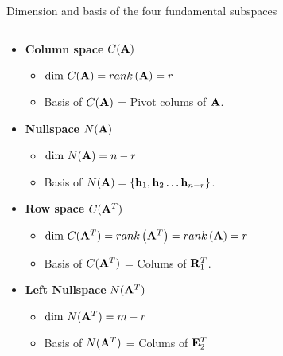 \documentclass[aspectratio=169]{beamer}
\def\mf{\ensuremath\mathbf}
\begin{document}
\begin{frame}[t]{Dimension and basis of the four fundamental subspaces}
\begin{columns}[T]
\begin{column}{0.5\textwidth}
\begin{small}
\begin{itemize}
    \item \textbf{Column space} $C(\mf{A})$
    \begin{itemize}
        \item $\dim \,C(\mf{A}) = rank\left(\mf{A}\right) = r$
        \item Basis of $C(\mf{A})$ = Pivot colums of $\mf{A}$.
    \end{itemize}
    \item \textbf{Nullspace} $N(\mf{A})$
    \begin{itemize}
        \item $\dim \,N(\mf{A}) = n-r$
        \item Basis of $N(\mf{A}) = \left\{\mf{h}_1, \mf{h}_2 \ldots \mf{h}_{n-r}\right\}$.
    \end{itemize}
    \item \textbf{Row space} $C(\mf{A}^T)$
    \begin{itemize}
        \item $\dim \,C(\mf{A}^T) = rank\left(\mf{A}^T\right) = rank\left(\mf{A}\right) = r$
        \item Basis of $C(\mf{A}^T)$ = Colums of $\mf{R}_1^T$.
    \end{itemize}
    \item \textbf{Left Nullspace} $N(\mf{A}^T)$
    \begin{itemize}
        \item $\dim \,N(\mf{A}^T) = m-r$
        \item Basis of $N(\mf{A}^T)$ = Colums of $\mf{E}_2^T$
    \end{itemize}
\end{itemize}
\end{small}
\end{column}
\end{columns}
\end{frame}
\end{document}
